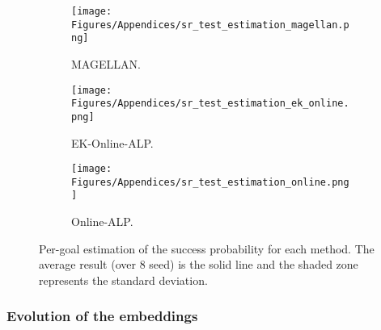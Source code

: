 \begin{figure}[H]
\centering
\begin{subfigure}{.49\textwidth}
    \centering
    \texttt{[image: Figures/Appendices/sr\_test\_estimation\_magellan.png]}  
    \caption{MAGELLAN.}
    \label{fig:MAGELLAN}
\end{subfigure}
\begin{subfigure}{.49\textwidth}
    \centering
    \texttt{[image: Figures/Appendices/sr\_test\_estimation\_ek\_online.png]}  
    \caption{EK-Online-ALP.}
    \label{fig:ek_online_lp}
\end{subfigure}
\begin{subfigure}{.49\textwidth}
    \centering
    \texttt{[image: Figures/Appendices/sr\_test\_estimation\_online.png]}  
    \caption{Online-ALP.}
    \label{fig:_online_lp}
\end{subfigure}
\caption{Per-goal estimation of the success probability for each method. The average result (over $8$ seed) is the solid line and the shaded zone represents the standard deviation.}
\label{fig:sampling_strategies}
\end{figure}

 \newpage
\subsubsection{Evolution of the embeddings}
\label{app:embedding_evolution}

